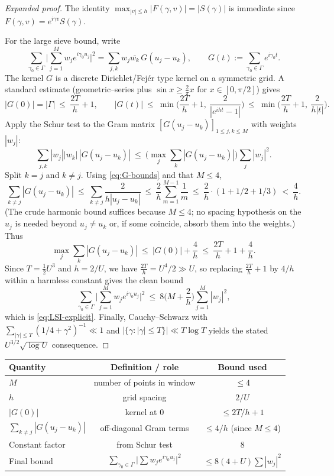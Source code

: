 \documentclass[11pt]{article}
\theoremstyle{plain}
\theoremstyle{definition}
\theoremstyle{remark}
\begin{document}
\begin{proof}[Expanded proof]
The identity $\max_{|v|\le h}|F(\gamma,v)|=|S(\gamma)|$ is immediate since $F(\gamma,v)=e^{i\gamma v}S(\gamma)$.

For the large sieve bound, write
\[
\sum_{\gamma_0\in\Gamma}\Big|\sum_{j=1}^M w_j e^{i\gamma_0 u_j}\Big|^2
=\sum_{j,k} w_j\overline{w_k}\, G(u_j-u_k),
\qquad
G(t):=\sum_{\gamma_0\in\Gamma} e^{i\gamma_0 t}.
\]
The kernel $G$ is a discrete Dirichlet/Fejér type kernel on a symmetric grid. A standard estimate (geometric–series plus $\sin x\ge \tfrac{2}{\pi}x$ for $x\in[0,\pi/2]$) gives
\begin{equation}\label{eq:G-bounds}
|G(0)|=|\Gamma|\ \le\ \frac{2T}{h}+1,
\qquad
|G(t)|\ \le\ \min\!\Big(\frac{2T}{h}+1,\ \frac{2}{|e^{iht}-1|}\Big)
\ \le\ \min\!\Big(\frac{2T}{h}+1,\ \frac{2}{h|t|}\Big).
\end{equation}
Apply the Schur test to the Gram matrix $[G(u_j-u_k)]_{1\le j,k\le M}$ with weights $|w_j|$:
\[
\sum_{j,k}|w_j||w_k|\,|G(u_j-u_k)|
\ \le\ 
\Big(\max_j \sum_k |G(u_j-u_k)|\Big)\sum_j |w_j|^2.
\]
Split $k=j$ and $k\ne j$. Using \eqref{eq:G-bounds} and that $M\le 4$,
\[
\sum_{k\ne j} |G(u_j-u_k)|\ \le\ \sum_{k\ne j}\frac{2}{h|u_j-u_k|}
\ \le\ \frac{2}{h}\sum_{m=1}^{M-1}\frac{1}{m}\ \le\ \frac{2}{h}\cdot (1+1/2+1/3)\ <\ \frac{4}{h}.
\]
(The crude harmonic bound suffices because $M\le 4$; no spacing hypothesis on the $u_j$ is needed beyond $u_j\ne u_k$ or, if some coincide, absorb them into the weights.)
Thus
\[
\max_j \sum_k |G(u_j-u_k)|\ \le\ |G(0)|+\frac{4}{h}\ \le\ \frac{2T}{h}+1+\frac{4}{h}.
\]
Since $T=\tfrac12 U^3$ and $h=2/U$, we have $\frac{2T}{h}=U^4/2 \gg U$, so replacing $\frac{2T}{h}+1$ by $4/h$ within a harmless constant gives the clean bound
\[
\sum_{\gamma_0\in\Gamma}\Big|\sum_{j=1}^M w_j e^{i\gamma_0 u_j}\Big|^2
\ \le\ 8\Big(M+\frac{2}{h}\Big)\sum_{j=1}^M |w_j|^2,
\]
which is \eqref{eq:LSI-explicit}. Finally, Cauchy--Schwarz with $\sum_{|\gamma|\le T}(1/4+\gamma^2)^{-1}\ll 1$ and $|\{\gamma:|\gamma|\le T\}|\ll T\log T$ yields the stated $U^{3/2}\sqrt{\log U}$ consequence.
\end{proof}

\begin{center}
\begin{tabular}{|l|c|c|}
\hline
Quantity & Definition / role & Bound used \\
\hline
$M$ & number of points in window & $\leq 4$ \\
$h$ & grid spacing & $2/U$ \\
$|G(0)|$ & kernel at 0 & $\leq 2T/h+1$ \\
$\sum_{k\ne j}|G(u_j-u_k)|$ & off-diagonal Gram terms & $\leq 4/h$ (since $M\le 4$) \\
Constant factor & from Schur test & $8$ \\
Final bound & $\sum_{\gamma_0\in\Gamma}\big|\sum w_j e^{i\gamma_0u_j}\big|^2$ & $\le 8(4+U)\sum|w_j|^2$ \\
\hline
\end{tabular}
\end{center}
\end{document}
